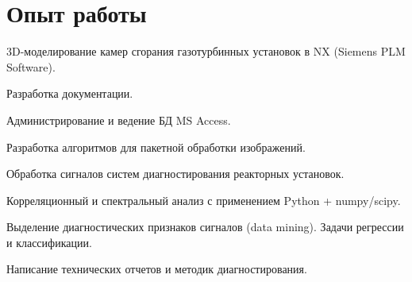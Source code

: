 \documentclass[a4paper]{resume}
\begin{document}
\begin{minipage}[t]{0.64\textwidth} %

\section{Опыт работы}


\vspace{\topsep} %
\begin{tightitemize}
\item 3D-моделирование камер сгорания газотурбинных установок в NX (Siemens PLM Software).
\item Разработка документации.
\end{tightitemize}

\sectionspace 


\begin{tightitemize}
\item Администрирование и ведение БД MS Access.
\item Разработка алгоритмов для пакетной обработки изображений. 
\end{tightitemize}

\sectionspace 


\begin{tightitemize}
\item Обработка сигналов систем диагностирования реакторных установок. 
\item Корреляционный и спектральный анализ с применением Python + numpy/scipy.
\item Выделение диагностических признаков сигналов (data mining). Задачи регрессии и классификации.
\item Написание технических отчетов и методик диагностирования.
\end{tightitemize}


\end{minipage}
\end{document}
